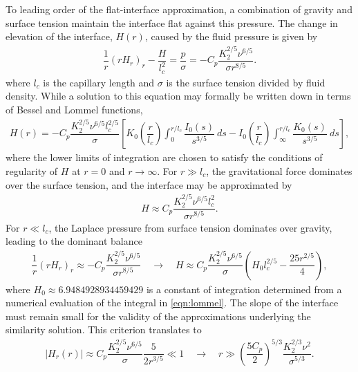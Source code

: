 \documentclass[]{jfm}
\begin{document}
To leading order of the flat-interface approximation, a combination of gravity and surface tension maintain the interface flat against this pressure. 
The change in elevation of the interface, $H(r)$, caused by the fluid pressure is given by
\begin{align}
\dfrac{1}{r} \left( r H_r \right)_r - \dfrac{H}{l_c^2} = \dfrac{p}{\sigma} = -  C_p \dfrac{K_2^{2/5} \nu^{6/5}}{ \sigma r^{8/5}}.
\end{align}
where $l_c$ is the capillary length and $\sigma$ is the surface tension divided by fluid density.
While a solution to this equation may formally be written down in terms of Bessel and Lommel functions,
\begin{align}
 H(r) = -  C_p \dfrac{K_2^{2/5} \nu^{6/5}l_c^{2/5}}{\sigma} \left[ K_0\left(\dfrac{r}{l_c} \right) \int^{r/l_c}_0 \dfrac{I_0(s)}{s^{3/5}}~ds - I_0\left(\dfrac{r}{l_c} \right) \int^{r/l_c}_\infty \dfrac{K_0(s)}{s^{3/5}}~ds \right],
\label{eqn:lommel}
\end{align}
where the lower limits of integration are chosen to satisfy the conditions of regularity of $H$ at $r=0$ and $r\to\infty$.
For $r\gg l_c$, the gravitational force dominates over the surface tension, and the interface may be approximated by
\begin{align}
 H \approx C_p \dfrac{K_2^{2/5} \nu^{6/5} l_c^2}{ \sigma r^{8/5}}.
\end{align}
For $r\ll l_c$, the Laplace pressure from surface tension dominates over gravity, leading to the dominant balance
\begin{align}
\dfrac{1}{r} \left( r H_r \right)_r \approx  -  C_p \dfrac{K_2^{2/5} \nu^{6/5}}{ \sigma r^{8/5}} \quad \longrightarrow \quad H \approx  C_p \dfrac{K_2^{2/5} \nu^{6/5}}{ \sigma } \left(H_0 l_c^{2/5} - \dfrac{25r^{2/5}}{4} \right),
\end{align}
where $H_0 \approx 6.9484928934459429$ is a constant of integration determined from a numerical evaluation of the integral in \eqref{eqn:lommel}.
The slope of the interface must remain small for the validity of the approximations underlying the similarity solution. 
This criterion translates to
\begin{align}
 |H_r(r)| \approx C_p \dfrac{K_2^{2/5} \nu^{6/5}}{ \sigma } \dfrac{5}{2r^{3/5}} \ll 1 \quad \longrightarrow \quad r \gg \left(\dfrac{5C_p}{2}\right)^{5/3} \dfrac{K_2^{2/3} \nu^{2}}{ \sigma^{5/3} }.
\end{align}
\end{document}
